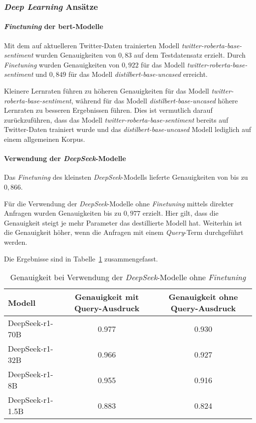 \subsubsection{\textit{Deep Learning} Ansätze}\label{subsubsec:ergebnisse-deep-learning-ansaetze}

\paragraph{\textit{Finetuning} der \gls{bert}-Modelle}
Mit dem auf aktuelleren Twitter-Daten trainierten Modell \textit{twitter-roberta-base-sentiment} wurden Genauigkeiten von $0,83$ auf dem Testdatensatz erzielt.
Durch \textit{Finetuning} wurden Genauigkeiten von $0,922$ für das Modell \textit{twitter-roberta-base-sentiment} und $0,849$ für das Modell \textit{distilbert-base-uncased} erreicht.

Kleinere Lernraten führen zu höheren Genauigkeiten für das Modell \textit{twitter-roberta-base-sentiment}, während für das Modell \textit{distilbert-base-uncased} höhere Lernraten zu besseren Ergebnissen führen.
Dies ist vermutlich darauf zurückzuführen, dass das Modell \textit{twitter-roberta-base-sentiment} bereits auf Twitter-Daten trainiert wurde und das \textit{distilbert-base-uncased} Modell lediglich auf einem allgemeinen Korpus.

\paragraph{Verwendung der \textit{DeepSeek}-Modelle}
Das \textit{Finetuning} des kleinsten \textit{DeepSeek}-Modells lieferte Genauigkeiten von bis zu $0,866$.

Für die Verwendung der \textit{DeepSeek}-Modelle ohne \textit{Finetuning} mittels direkter Anfragen wurden Genauigkeiten bis zu $0,977$ erzielt.
Hier gilt, dass die Genauigkeit steigt je mehr Parameter das destillierte Modell hat.
Weiterhin ist die Genauigkeit höher, wenn die Anfragen mit einem \textit{Query}-Term durchgeführt werden.

Die Ergebnisse sind in Tabelle~\ref{tab:deepseek-results} zusammengefasst.
\begin{table}
    \center
    \begin{tabular}{lcc}
        \toprule
        Modell           & Genauigkeit mit Query-Ausdruck & Genauigkeit ohne Query-Ausdruck \\
        \midrule
        DeepSeek-r1-70B  & 0.977                           &  0.930                         \\
        DeepSeek-r1-32B  & 0.966                           &  0.927                         \\
        DeepSeek-r1-8B   & 0.955                           &  0.916                         \\
        DeepSeek-r1-1.5B & 0.883                           &  0.824                         \\
        \bottomrule
    \end{tabular}
    \caption{Genauigkeit bei Verwendung der \textit{DeepSeek}-Modelle ohne \textit{Finetuning}}
    \label{tab:deepseek-results}
\end{table}
